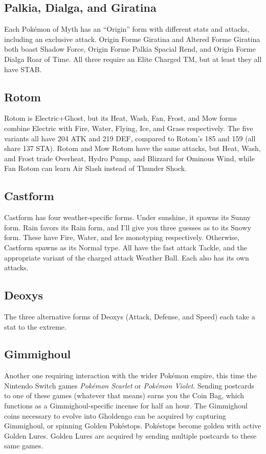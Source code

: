 \subsection{Palkia, Dialga, and Giratina}
Each Pokémon of Myth has an ``Origin'' form with different stats and attacks, including
 an exclusive attack.
Origin Forme Giratina and Altered Forme Giratina both boast Shadow Force, Origin Forme Palkia Spacial Rend,
 and Origin Forme Dialga Roar of Time.
All three require an Elite Charged TM, but at least they all have STAB\@.

\subsection{Rotom}
Rotom is Electric+Ghost, but its Heat, Wash, Fan, Frost, and Mow forms
 combine Electric with Fire, Water, Flying, Ice, and Grass respectively.
The five variants all have 204 ATK and 219 DEF, compared to Rotom's
 185 and 159 (all share 137 STA).
Rotom and Mow Rotom have the same attacks, but Heat, Wash, and Frost
  trade Overheat, Hydro Pump, and Blizzard for Ominous Wind,
  while Fan Rotom can learn Air Slash instead of Thunder Shock.

\subsection{Castform}
Castform has four weather-specific forms.
Under sunshine, it spawns its Sunny form.
Rain favors its Rain form, and I'll give you three guesses as to its Snowy form.
These have Fire, Water, and Ice monotyping respectively.
Otherwise, Castform spawns as its Normal type.
All have the fast attack Tackle, and the appropriate variant of the charged attack Weather Ball.
Each also has its own attacks.

\subsection{Deoxys}
The three alternative forms of Deoxys (Attack, Defense, and Speed) each take a stat to the extreme.

\subsection{Gimmighoul\label{sec:gimmighoul}}
Another one requiring interaction with the wider Pokémon empire, this time
 the Nintendo Switch games \textit{Pokémon Scarlet} or \textit{Pokémon Violet}.
Sending postcards to one of these games (whatever that means) earns you the Coin Bag,
 which functions as a Gimmighoul-specific incense for half an hour.
The Gimmighoul coins necessary to evolve into Gholdengo can be acquired by capturing
 Gimmighoul, or spinning Golden Pokéstops.
Pokéstops become golden with active Golden Lures.
Golden Lures are acquired by sending multiple postcards to these same games.

